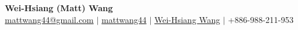 \documentclass[letterpaper,11pt]{article}
\begin{document}
\begin{center}
  \textbf{\Large Wei-Hsiang (Matt) Wang} \\
  \vspace{8px}
  \href{mailto:mattwang44@gmail.com}{\faEnvelope \hspace{1px} mattwang44@gmail.com} {{$\vert$}}
  \href{https://github.com/mattwang44/}{\faGithub \hspace{1px} mattwang44} {{$\vert$}}
  \href{https://www.linkedin.com/in/weihsiang-wang/}{\faLinkedin \hspace{1px} Wei-Hsiang Wang} {{$\vert$}}
  { \faPhoneSquare \hspace{1px} +886-988-211-953}
\end{center}

\vspace{-8px}
\end{document}
